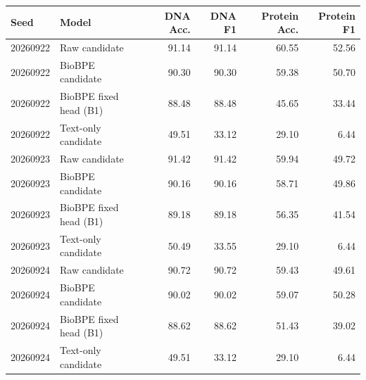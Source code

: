 \begin{tabular}{llrrrr}
\toprule
Seed & Model & DNA Acc. & DNA F1 & Protein Acc. & Protein F1 \\
\midrule
20260922 & Raw candidate & 91.14 & 91.14 & 60.55 & 52.56 \\
20260922 & BioBPE candidate & 90.30 & 90.30 & 59.38 & 50.70 \\
20260922 & BioBPE fixed head (B1) & 88.48 & 88.48 & 45.65 & 33.44 \\
20260922 & Text-only candidate & 49.51 & 33.12 & 29.10 & 6.44 \\
20260923 & Raw candidate & 91.42 & 91.42 & 59.94 & 49.72 \\
20260923 & BioBPE candidate & 90.16 & 90.16 & 58.71 & 49.86 \\
20260923 & BioBPE fixed head (B1) & 89.18 & 89.18 & 56.35 & 41.54 \\
20260923 & Text-only candidate & 50.49 & 33.55 & 29.10 & 6.44 \\
20260924 & Raw candidate & 90.72 & 90.72 & 59.43 & 49.61 \\
20260924 & BioBPE candidate & 90.02 & 90.02 & 59.07 & 50.28 \\
20260924 & BioBPE fixed head (B1) & 88.62 & 88.62 & 51.43 & 39.02 \\
20260924 & Text-only candidate & 49.51 & 33.12 & 29.10 & 6.44 \\
\bottomrule
\end{tabular}
